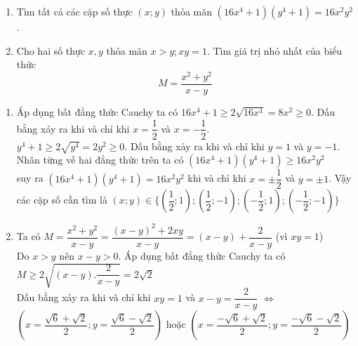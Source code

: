 \begin{ex}%
    \hfill
    \begin{enumerate}
    \item Tìm tất cả các cặp số thực $(x;y)$ thỏa mãn $(16x^4+1)(y^4+1)=16x^2y^2$.
    \item Cho hai số thực $x,y$ thỏa mãn $x>y; xy=1$. Tìm giá trị nhỏ nhất của biểu thức
    $$M=\dfrac{x^2+y^2}{x-y}$$
    \end{enumerate}
\loigiai
    {
    \begin{enumerate}
\item   Áp dụng bất đẳng thức Cauchy ta có $16x^4+1 \geq 2\sqrt{16x^4}=8x^2\geq 0$. Dấu bằng xảy ra khi và chỉ khi $x=\dfrac{1}{2}$ và $x=-\dfrac{1}{2}$.\\
   $y^4+1 \geq 2\sqrt{y^4}=2y^2 \geq 0$. Dấu bằng xảy ra khi và chỉ khi $y=1$ và $y=-1$.\\
   Nhân từng vế hai đẳng thức trên ta có $(16x^4+1)(y^4+1) \geq 16x^2y^2$\\
    suy ra $(16x^4+1)(y^4+1) = 16x^2y^2$ khi và chỉ khi $x=\pm \dfrac{1}{2}$ và $y=\pm 1$.
    Vậy các cặp số cần tìm là $(x;y) \in \{ \left(\dfrac{1}{2};1\right); \left(\dfrac{1}{2};-1\right); \left(-\dfrac{1}{2};1\right); \left(-\dfrac{1}{2};-1\right)  \}$
   \item Ta có $M=\dfrac{x^2+y^2}{x-y}=\dfrac{(x-y)^2+2xy}{x-y}=(x-y)+\dfrac{2}{x-y}$ (vì $xy=1$)\\
   Do $x>y$ nên $x-y>0$. Áp dụng bất đẳng thức Cauchy ta có\\
   $M \geq 2\sqrt{(x-y).\dfrac{2}{x-y}}=2\sqrt{2}$\\
   Dấu bằng xảy ra khi và chỉ khi  $xy=1$ và $x-y=\dfrac{2}{x-y}$ $\Leftrightarrow$ $\left( x=\dfrac{\sqrt{6}+\sqrt{2}}{2};y=\dfrac{\sqrt{6}-\sqrt{2}}{2} \right)$ hoặc $\left( x=\dfrac{-\sqrt{6}+\sqrt{2}}{2};y=\dfrac{-\sqrt{6}-\sqrt{2}}{2} \right)$ 
    \end{enumerate}
    }
    
\end{ex}

